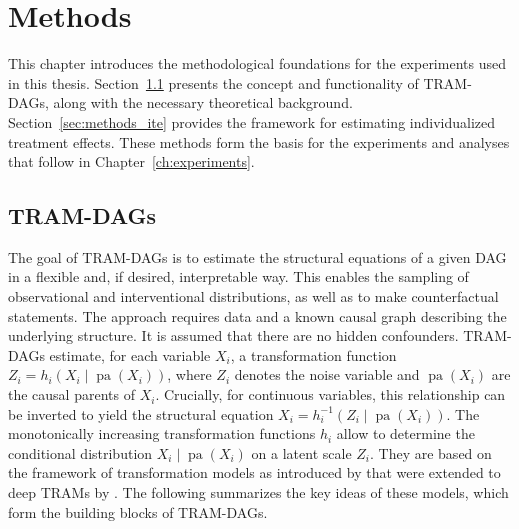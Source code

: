 




\chapter{Methods}

This chapter introduces the methodological foundations for the experiments used in this thesis. Section~\ref{sec:methods_tram_dags} presents the concept and functionality of TRAM-DAGs, along with the necessary theoretical background. Section~\ref{sec:methods_ite} provides the framework for estimating individualized treatment effects.  These methods form the basis for the experiments and analyses that follow in Chapter~\ref{ch:experiments}.



\section{TRAM-DAGs} \label{sec:methods_tram_dags}

The goal of TRAM-DAGs \citep{sick2025} is to estimate the structural equations of a given DAG in a flexible and, if desired, interpretable way. This enables the sampling of observational and interventional distributions, as well as to make counterfactual statements. The approach requires data and a known causal graph describing the underlying structure. It is assumed that there are no hidden confounders. TRAM-DAGs estimate, for each variable $X_i$, a transformation function $Z_i = h_i(X_i \mid \operatorname{pa}(X_i))$, where $Z_i$ denotes the noise variable and $\operatorname{pa}(X_i)$ are the causal parents of $X_i$. Crucially, for continuous variables, this relationship can be inverted to yield the structural equation $X_i = h_i^{-1}(Z_i \mid \operatorname{pa}(X_i))$. The monotonically increasing transformation functions $h_i$ allow to determine the conditional distribution  $X_i \mid \operatorname{pa}(X_i)$ on a latent scale $Z_i$. They are based on the framework of transformation models as introduced by \citet{hothorn2014} that were extended to deep TRAMs by \citet{sick2020}. The following summarizes the key ideas of these models, which form the building blocks of TRAM-DAGs.


